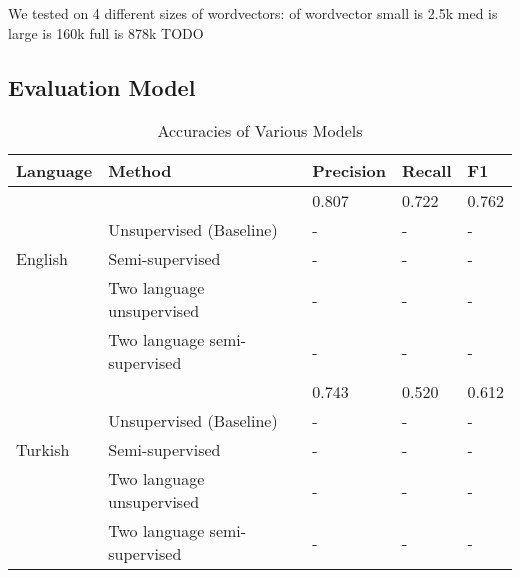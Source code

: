 \documentclass[11pt,twocolumn]{article}
\begin{document}
We tested on 4 different sizes of wordvectors:
of wordvector 
small is 2.5k
med is 
large is 160k
full is 878k TODO

\subsection{Evaluation Model}

\begin{table*}
    \begin{center}
        \begin{tabular}{ | l | l | l | l | l |}
            \hline
            Language & Method & Precision & Recall & F1 \\ \hline
                     & \citeauthor{Narasimhan15} & 0.807 & 0.722 & 0.762 \\ 
                     & Unsupervised (Baseline) & -  & - & - \\ 
            English & Semi-supervised & - & - & - \\ 
                    & Two language unsupervised & - & - & - \\ 
                    & Two language semi-supervised & - & - & - \\ \hline
                    & \citeauthor{Narasimhan15} & 0.743 & 0.520 & 0.612 \\ 
                    & Unsupervised (Baseline) & - & - & - \\ 
            Turkish & Semi-supervised & - & - & -  \\ 
                    & Two language unsupervised  & - & - & -  \\ 
                    & Two language semi-supervised  & - & - & -  \\ \hline
        \end{tabular}
        \caption{Accuracies of Various Models}
    \end{center}
\end{table*}
\end{document}
